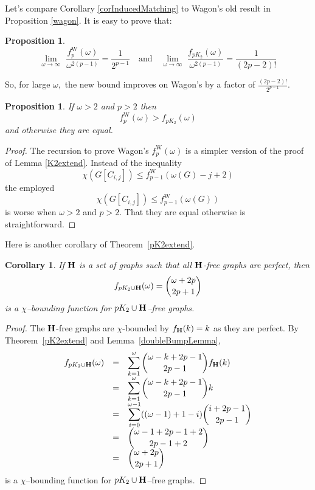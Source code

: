 \documentclass{article}
\theoremstyle{plain}
\newtheorem{cor}[thm]{Corollary}
\newtheorem{prop}[thm]{Proposition}
\theoremstyle{definition}
\begin{document}
Let's compare Corollary \ref{corInducedMatching} to Wagon's old result in Proposition \ref{wagon}. It is easy to prove that:
\begin{prop}
\[ \lim_{\omega \rightarrow \infty} \,\,   \frac{f_p^{\mathrm{W}}(\omega)}{\omega^{2(p-1)}} = \frac{1}{2^{p-1}} 
\quad
\textrm{and}
\quad
\lim_{\omega \rightarrow \infty} \,\,   \frac{f_{pK_2}(\omega)}{\omega^{2(p-1)}} = \frac{1}{(2p-2)!} 
\]
\end{prop}
So, for large $\omega,$ the new bound improves on Wagon's by a factor of $\frac{(2p-2)!}{2^{p-1}}.$
\begin{prop}
If $\omega>2$ and $p>2$ then
\[ f_p^{\mathrm{W}}(\omega) > f_{pK_2}(\omega) \]
and otherwise they are equal.
\end{prop}
\begin{proof} The recursion to prove Wagon's $f_p^{\mathrm{W}}(\omega)$ is a simpler version of the proof of Lemma \ref{K2extend}. Instead of the inequality
\[ \chi(G[C_{i,j}]) \leq f_{p-1}^{\mathrm{W}} ( \omega(G)-j+2 ) \]
the employed 
\[ \chi(G[C_{i,j}]) \leq f_{p-1}^{\mathrm{W}} ( \omega(G) ) \]
is worse when $\omega>2$ and $p>2$. That they are equal otherwise is straightforward.
\end{proof}

Here is another corollary of Theorem~\ref{pK2extend}.
\begin{cor} If $\bf H$ is a set of graphs such that all $\bf H$-free graphs are perfect, then
\[ f_{pK_2 \cup {\bf H  } }(\omega) = { \omega + 2p \choose 2p+1 } \]
is a $\chi$--bounding function for ${ pK_2 \cup \bf H  }$--free graphs.
\end{cor}
\begin{proof}
The $\bf H$-free graphs are $\chi$-bounded by $ f_{{\bf H  } }(k) = k$ as they are perfect. By Theorem~\ref{pK2extend} and Lemma~\ref{doubleBumpLemma},
\[
\begin{array}{rcl}
\displaystyle
f_{pK_2 \cup {\bf H  } }(\omega) & =& \displaystyle  \sum_{k=1}^{\omega}   {\omega-k + 2p-1  \choose 2p-1}    f_{{\bf H  } }(k)  \\ 
& = &  \displaystyle  \sum_{k=1}^{\omega}   {\omega-k + 2p-1  \choose 2p-1}  k \\
& = & \displaystyle  \sum_{i=0}^{\omega-1}  ((\omega-1)+1-i)   {i + 2p-1  \choose 2p-1}  \\
  & = &  \displaystyle { \omega - 1 + 2p -1 + 2\choose 2p-1 +2 } \\
  & = &  \displaystyle  { \omega + 2p \choose 2p+1 }
\end{array}
\]
is a $\chi$--bounding function for ${ pK_2 \cup \bf H  }$--free graphs.
\end{proof}
\end{document}
